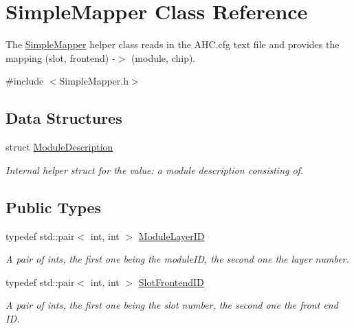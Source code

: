 \hypertarget{class_simple_mapper}{
\section{SimpleMapper Class Reference}
\label{class_simple_mapper}
}


The \hyperlink{class_simple_mapper}{SimpleMapper} helper class reads in the AHC.cfg text file and provides the mapping (slot, frontend) -\/$>$ (module, chip).  


{\ttfamily \#include $<$SimpleMapper.h$>$}\subsection*{Data Structures}
\begin{DoxyCompactItemize}
\item 
struct \hyperlink{struct_simple_mapper_1_1_module_description}{ModuleDescription}
\begin{DoxyCompactList}\small\item\em Internal helper struct for the value: a module description consisting of. \item\end{DoxyCompactList}\end{DoxyCompactItemize}
\subsection*{Public Types}
\begin{DoxyCompactItemize}
\item 
typedef std::pair$<$ int, int $>$ \hyperlink{class_simple_mapper_a6fbef133414fb482f870ab56e7237682}{ModuleLayerID}
\begin{DoxyCompactList}\small\item\em A pair of ints, the first one being the moduleID, the second one the layer number. \item\end{DoxyCompactList}\item 
typedef std::pair$<$ int, int $>$ \hyperlink{class_simple_mapper_a2b973730223591df7c876a6dfbb922a0}{SlotFrontendID}
\begin{DoxyCompactList}\small\item\em A pair of ints, the first one being the slot number, the second one the front end ID. \item\end{DoxyCompactList}\end{DoxyCompactItemize}
